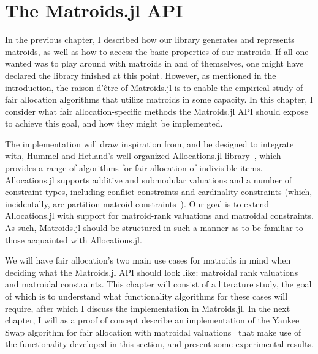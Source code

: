 \chapter{The Matroids.jl API}
\label{chap:matroids.jl}
\label{sec:fair-alloc-prelims}
In the previous chapter, I described how our library generates and represents matroids, as well as how to access the basic properties of our matroids. If all one wanted was to play around with matroids in and of themselves, one might have declared the library finished at this point. However, as mentioned in the introduction, the raison d'être of Matroids.jl is to enable the empirical study of fair allocation algorithms that utilize matroids in some capacity. In this chapter, I consider what fair allocation-specific methods the Matroids.jl API should expose to achieve this goal, and how they might be implemented. 

The implementation will draw inspiration from, and be designed to integrate with, Hummel and Hetland's well-organized Allocations.jl library~\cite{Hetland_Allocations_jl_2022}, which provides a range of algorithms for fair allocation of indivisible items. Allocations.jl supports additive and submodular valuations and a number of constraint types, including conflict constraints and cardinality constraints (which, incidentally, are partition matroid constraints~\cite{barman2020fair}). Our goal is to extend Allocations.jl with support for matroid-rank valuations and matroidal constraints. As such, Matroids.jl should be structured in such a manner as to be familiar to those acquainted with Allocations.jl.

We will have fair allocation's two main use cases for matroids in mind when deciding what the Matroids.jl API should look like: matroidal rank valuations and matroidal constraints. This chapter will consist of a literature study, the goal of which is to understand what functionality algorithms for these cases will require, after which I discuss the implementation in Matroids.jl. In the next chapter, I will as a proof of concept describe an implementation of the Yankee Swap algorithm for fair allocation with matroidal valuations~\cite{viswanathan2023yankee} that make use of the functionality developed in this section, and present some experimental results.



